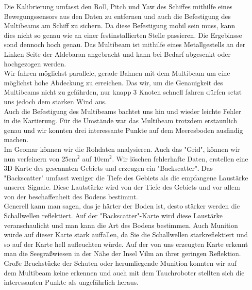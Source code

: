 Die Kalibrierung umfasst den Roll, Pitch und Yaw des Schiffes mithilfe eines Bewegungssensors aus den Daten zu 
entfernen und auch die Befestigung des Multibeams am Schiff zu sichern. Da diese Befestigung mobil sein muss, kann
dies nicht so genau wie an einer festinstallierten Stelle passieren. Die Ergebinsse sond dennoch hoch genau. 
Das Multibeam ist mithilfe eines Metallgestells an der Linken Seite der Aldebaran angebracht und kann bei Bedarf 
abgesenkt oder hochgezogen werden.\\

Wir fahren möglichst parallele, gerade Bahnen mit dem Multibeam um eine möglichst hohe Abdeckung zu erreichen. 
Das wir, um die Genauigkeit des Multibeams nicht zu gefährden, nur knapp 3 Knoten schnell fahren dürfen setzt
uns jedoch dem starken Wind aus. \\

Auch die Befestigung des Multibeams bachtet uns hin und wieder leichte Fehler in die Kartierung. Für die 
Umstände war das Multibeam trotzdem erstaunlich genau und wir konnten drei interessante Punkte auf dem 
Meeresboden ausfindig machen. \\

Im Geomar können wir die Rohdaten analysieren. Auch das "Grid", können wir nun verfeinern von 25cm$^2$ auf 10cm$^2$. 
Wir löschen fehlerhafte Daten, erstellen eine 3D-Karte des gescannten Gebiets und erzeugen ein "Backscatter". 
Das "Backscatter" umfasst weniger die Tiefe des Gebiets als die empfangene Laustärke unserer Signale. 
Diese Lautstärke wird von der Tiefe des Gebiets und vor allem von der beschaffenheit des Bodens bestimmt. \\

Generell kann man sagen, das je härter der Boden ist, desto stärker werden die Schallwellen reflektiert. 
Auf der "Backscatter"-Karte wird diese Laustärke veranschaulicht und man kann die Art des Bodens bestimmen.
Auch Munition würde auf dieser Karte stark auffallen, da Sie die Schallwellen starkreflektiert und so 
auf der Karte hell aufleuchten würde. Auf der von uns erzeugten Karte erkennt man die Seegraßwiesen in 
der Nähe der Insel Vilm an ihrer geringen Reflektion.\\

Große Bruchstücke der Schuten oder herumliegende Munition konnten wir auf dem Multibeam keine erkennen und 
auch mit dem Tauchroboter stellten sich die interessanten Punkte als ungefährlich heraus. \\
